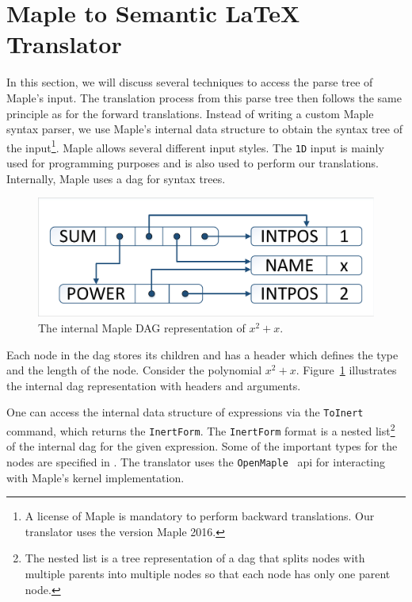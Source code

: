 \documentclass[a4paper,11pt]{article}
\newcommand{\Maple}{Maple}
\newcommand{\inertF}{\texttt{InertForm}}
\theoremstyle{defTheoStyle}
\theoremstyle{defExampStyle}
\begin{document}
\section{\Maple{} to Semantic \LaTeX{} Translator}\label{sec:backward-translation}
In this section, we will discuss several techniques to access the parse tree of \Maple's input. The translation process from this parse tree then follows the same principle as for the forward translations. Instead of writing a custom \Maple{} syntax parser, we use \Maple's internal data structure to obtain the syntax tree of the input\footnote{A license of \Maple{} is mandatory to perform backward translations. Our translator uses the version \Maple{} 2016.}. \Maple{} allows several different input styles. The \texttt{1D} input is mainly used for programming purposes 
and is also used to perform our translations. Internally, \Maple{} uses a \gls*{dag} for syntax trees.

\begin{figure}
	\vspace{-15pt}
	\centering
	\includegraphics[clip, trim=0.5cm 0.5cm 0.5cm 0.5cm, scale=0.5]{DAGreal.pdf}
	\vspace{-5pt}
	\caption{The internal \Maple{} DAG representation of $x^2+x$.}
	\label{fig:internal-maple-dag}
\end{figure}

Each node in the \gls*{dag} stores its children and has a header which defines the type and the length of the node. Consider the polynomial $x^2+x$. Figure~\ref{fig:internal-maple-dag} illustrates the internal \gls*{dag} representation with headers and arguments.

One can access the internal data structure of expressions via the \texttt{ToInert} command, which returns the \inertF. The \inertF{} format is a nested list\footnote{The nested list is a tree representation of a \gls*{dag} that splits nodes with multiple parents into multiple nodes so that each node has only one parent node.} of the internal \gls*{dag} for the given expression. Some of the important types for the nodes are specified in . The translator uses the \texttt{OpenMaple}~\parencite[\S 14.3]{MAPLE:ProgrammingGuide} \gls*{api} for interacting with \Maple's kernel implementation.
\end{document}

